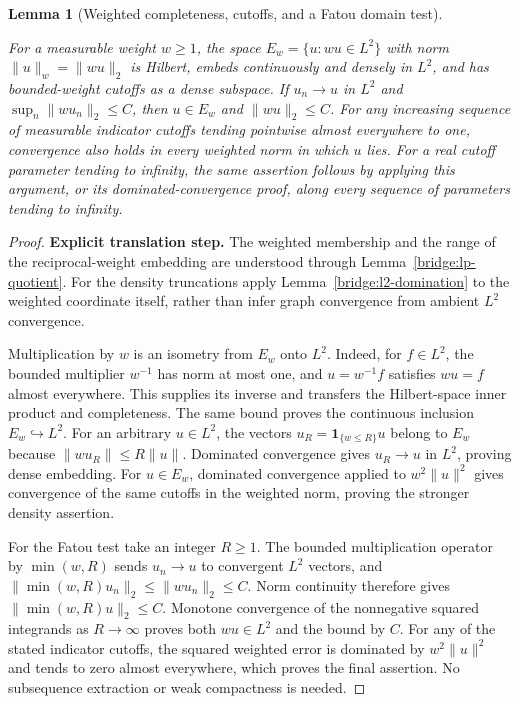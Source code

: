 \documentclass[11pt,a4paper]{article}
\newtheorem{lemma}[theorem]{Lemma}
\theoremstyle{definition}
\theoremstyle{remark}
\newcommand{\proofid}[1]{\par\smallskip{\normalfont\scriptsize\color{inkblue}Stable ID: \nolinkurl{#1}}\par\smallskip}
\begin{document}
\begin{lemma}[Weighted completeness, cutoffs, and a Fatou domain test]
\label{basic:weighted-space}
\proofid{basic:weighted-space}
\par{}\par\smallskip

For a measurable weight $w\geq1$, the space
$E_w=\{u:wu\in L^2\}$ with norm $\|u\|_w=\|wu\|_2$ is Hilbert,
embeds continuously and densely in $L^2$, and has bounded-weight cutoffs as a
dense subspace. If $u_n\to u$ in $L^2$ and
$\sup_n\|wu_n\|_2\leq C$, then $u\in E_w$ and $\|wu\|_2\leq C$.
For any increasing sequence of measurable indicator cutoffs tending
pointwise almost everywhere to one, convergence also holds in every
weighted norm in which $u$ lies. For a real cutoff parameter tending
to infinity, the same assertion follows by applying this argument,
or its dominated-convergence proof, along every sequence of parameters
tending to infinity.
\end{lemma}
\begin{proof}
\noindent\textbf{Explicit translation step.} The weighted membership and the range of the reciprocal-weight embedding
are understood through Lemma~\ref{bridge:lp-quotient}. For the density
truncations apply Lemma~\ref{bridge:l2-domination} to the weighted
coordinate itself, rather than infer graph convergence from ambient
$L^2$ convergence.

Multiplication by $w$ is an isometry from $E_w$ onto $L^2$.
Indeed, for $f\in L^2$, the bounded multiplier $w^{-1}$ has norm
at most one, and $u=w^{-1}f$ satisfies $wu=f$ almost everywhere.
This supplies its inverse and transfers the Hilbert-space inner product
and completeness. The same bound proves the continuous inclusion
$E_w\hookrightarrow L^2$. For an arbitrary $u\in L^2$, the vectors
$u_R=\mathbf1_{\{w\leq R\}}u$ belong to $E_w$ because
$\|wu_R\|\leq R\|u\|$. Dominated convergence gives $u_R\to u$
in $L^2$, proving dense embedding. For $u\in E_w$, dominated
convergence applied to $w^2\|u\|^2$ gives convergence of the same
cutoffs in the weighted norm, proving the stronger density assertion.

For the Fatou test take an integer $R\geq1$. The bounded multiplication
operator by $\min(w,R)$ sends $u_n\to u$ to convergent $L^2$ vectors,
and $\|\min(w,R)u_n\|_2\leq\|wu_n\|_2\leq C$. Norm continuity
therefore gives $\|\min(w,R)u\|_2\leq C$. Monotone convergence of
the nonnegative squared integrands as $R\to\infty$ proves both
$wu\in L^2$ and the bound by $C$. For any of the stated indicator
cutoffs, the squared weighted error is dominated by $w^2\|u\|^2$
and tends to zero almost everywhere, which proves the final assertion.
No subsequence extraction or weak compactness is needed.
\end{proof}
\end{document}

